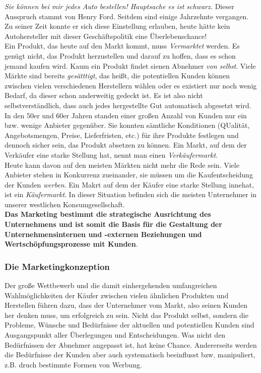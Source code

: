 \documentclass[a4paper, 12pt]{report}
\begin{document}
\emph{Sie können bei mir jedes Auto bestellen! Hauptsache es ist schwarz.} 
Dieser Ausspruch stammt von Henry Ford. Seitdem sind einige Jahrzehnte 
vergangen. Zu seiner Zeit konnte er sich diese Einstellung erlauben, heute 
hätte kein Autohersteller mit dieser Geschäftspolitik eine Überlebenschance! \\

Ein Produkt, das heute auf den Markt kommt, muss \emph{Vermarktet} werden. Es 
genügt nicht, das Produkt herzustellen und darauf zu hoffen, dass es schon 
jemand kaufen wird. Kaum ein Produkt findet sienen Abnehmer \emph{von selbst}. 
Viele Märkte sind bereits \emph{gesätttigt}, das heißt, die potentiellen Kunden 
können zwischen vielen verschiedenen Herstellern wählen oder es existiert nur 
noch wenig Bedarf, da dieser schon anderweitig gedeckt ist. Es ist also nicht 
selbstverständlich, dass auch jedes hergestellte Gut automatisch abgesetzt 
wird. \\

In den 50er und 60er Jahren standen einer großen Anzahl von Kunden nur ein bzw. 
wenige Anbieter gegenüber. Sie konnten sämtliche Konditionen (QUalität, 
Angebotsmengen, Preise, Lieferfristen, etc.) für ihre Produkte festlegen und 
dennoch sicher sein, das Produkt absetzen zu können. Ein Markt, auf dem der 
Verkäufer eine starke Stellung hat, nennt man einen \emph{Verkäufermarkt}. \\

Heute kann davon auf den meisten Märkten nicht mehr die Rede sein. Viele 
Anbieter stehen in Konkurrenz zueinander, sie müssen um die Kaufentscheidung der 
Kunden \emph{werben}. Ein Makrt auf dem der Käufer eine starke Stellung innehat, 
ist ein \emph{Käufermarkt}. In dieser Situation befinden sich die meisten 
Unternehmer in unserer westlichen Konsumgesellschaft. \\

\textbf{Das Marketing bestimmt die strategische Ausrichtung des Unternehmens und
ist somit die Basis für die Gestaltung der Unternehmensinternen und -externen 
Beziehungen und Wertschöpfungsprozesse mit Kunden}. \\

\subsubsection{Die Marketingkonzeption}

Der große Wettbewerb und die damit einhergehenden umfangreichen 
Wahlmöglichkeiten der Käufer zwischen vielen ähnlichen Produkten und Herstellen 
führen dazu, dass der Unternehmer vom Markt, also seinen Kunden her denken muss,
um erfolgreich zu sein. Nicht das Produkt selbst, sondern die Probleme, Wünsche 
und Bedürfnisse der aktuellen und potentiellen Kunden sind Ausgangspunkt aller 
Überlegungen und Entscheidungen. Was nicht den Bedürfnissen der Abnehmer 
angepasst ist, hat keine Chance. Andererseits werden die Bedürfnisse der Kunden 
aber auch systematisch beeinflusst bzw. manipuliert, z.B. druch bestimmte Formen 
von Werbung. \\
\end{document}
